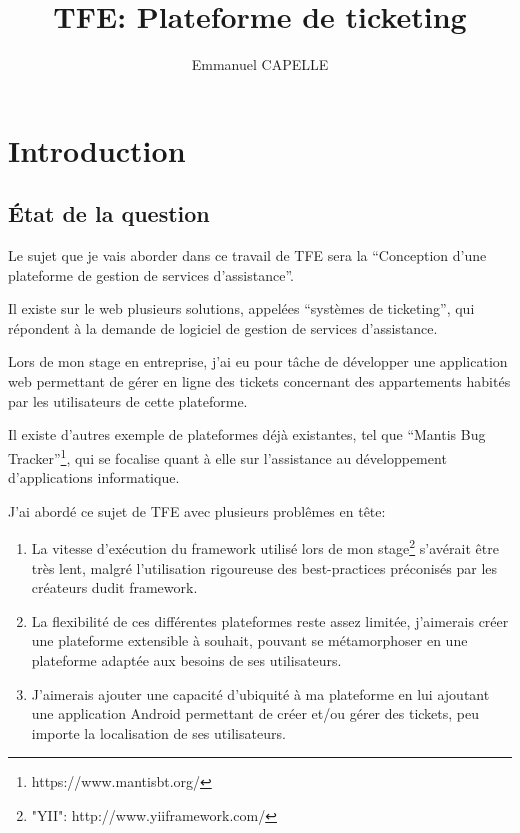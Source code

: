\documentclass{report}
\title{TFE: Plateforme de ticketing}
\author{Emmanuel CAPELLE}
\date{}
\begin{document}
\maketitle

\newpage

\tableofcontents

\newpage

\chapter{Introduction}

\section{État de la question}
Le sujet que je vais aborder dans ce travail de TFE sera la “Conception d’une plateforme de gestion de services d’assistance”.

Il existe sur le web plusieurs solutions, appelées “systèmes de ticketing”, qui répondent à la demande de logiciel de gestion de services d’assistance.

Lors de mon stage en entreprise, j’ai eu pour tâche de développer une application web permettant de gérer en ligne des tickets concernant des appartements habités par les utilisateurs de cette plateforme.

Il existe d’autres exemple de plateformes déjà existantes, tel que “Mantis Bug Tracker”\footnote{https://www.mantisbt.org/}, qui se focalise quant à elle sur l’assistance au développement d’applications informatique.

J’ai abordé ce sujet de TFE avec plusieurs problêmes en tête:
\begin{enumerate}
\item{La vitesse d’exécution du framework utilisé lors de mon stage\footnote{"YII": http://www.yiiframework.com/} s’avérait être très lent, malgré l’utilisation rigoureuse des best-practices préconisés par les créateurs dudit framework.}
\item{La flexibilité de ces différentes plateformes reste assez limitée, j’aimerais créer une plateforme extensible à souhait, pouvant se métamorphoser en une plateforme adaptée aux besoins de ses utilisateurs.}
\item{J’aimerais ajouter une capacité d’ubiquité à ma plateforme en lui ajoutant une application Android permettant de créer et/ou gérer des tickets, peu importe la localisation de ses utilisateurs.}
\end{enumerate}
\end{document}
